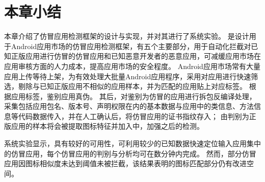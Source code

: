 
\section{本章小结}

本章介绍了仿冒应用检测框架\mytool 的设计与实现，并对其进行了系统实验。
\mytool 是设计用于Android应用市场的仿冒应用检测框架，有五个主要部分，用于自动化拦截对已知正版应用进行仿冒的仿冒应用和已知恶意开发者的恶意应用，可减缓应用市场在应用审核方面的人力成本，提高应用市场的安全程度。
Android应用市场常有大量应用上传等待上架，为有效处理大批量Android应用程序，\mytool 采用\componentA 对应用进行快速筛选，剔除与已知正版应用不相似的应用样本，并为匹配的应用贴上对应标签。
\componentB 根据应用标签，鉴别应用真伪。
其后，\componentC 对\componentB 鉴别为仿冒的应用进行拆包反编译处理，采集包括应用包名、版本号、声明权限在内的基本数据与应用中的类信息、方法信息等代码数据传入\componentD ，并在人工确认后，将仿冒应用的证书指纹存入\componentE ；
由\componentB 判别为正版应用的样本将会被提取图标特征并加入\componentE 中，加强之后的检测。

系统实验显示，\mytool 具有较好的可用性，可利用较少的已知数据快速定位输入应用集中的仿冒应用，每个仿冒应用的判别与分析均可在数分钟内完成。
然而，部分仿冒应用因图标相似度未达到阈值未被\mytool 拦截，该结果表明\mytool 的图标匹配部分仍有改进空间。
